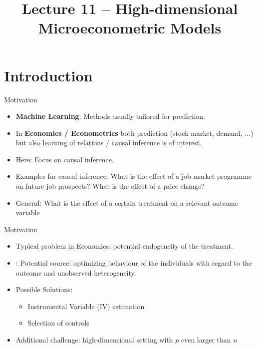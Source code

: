 \documentclass{beamer}
\author[]{}
\title[hdm]{Lecture 11 -- High-dimensional Microeconometric Models}
\begin{document}
\frame{\maketitle}

\begin{frame}
\tableofcontents
\end{frame}

\section{Introduction}

\begin{frame}{Motivation}
\begin{itemize}
	\item \textbf{Machine Learning}: Methods usually tailored for prediction.
	\item In \textbf{Economics / Econometrics} both prediction (stock market, demand, ...) but also learning of relations / causal inference is of interest.
	\item Here: Focus on causal inference.
	\item Examples for causal inference: What is the effect of a job market programme on future job prospects? What is the effect of a price change?
	\item General: What is the effect of a certain treatment on a relevant outcome variable
\end{itemize}
\end{frame}


\begin{frame}{Motivation}
\begin{itemize}
	\item Typical problem in Economics: potential endogeneity of the treatment.
	\item: Potential source: optimizing behaviour of the individuals with regard to the outcome and unobserved heterogeneity.
	\item Possible Solutions:
	\begin{itemize}
		\item Instrumental Variable (IV) estimation
		\item Selection of controls
	\end{itemize}
	\item Additional challenge: high-dimensional setting with $p$ even larger than $n$
\end{itemize}
\end{frame}
\end{document}
